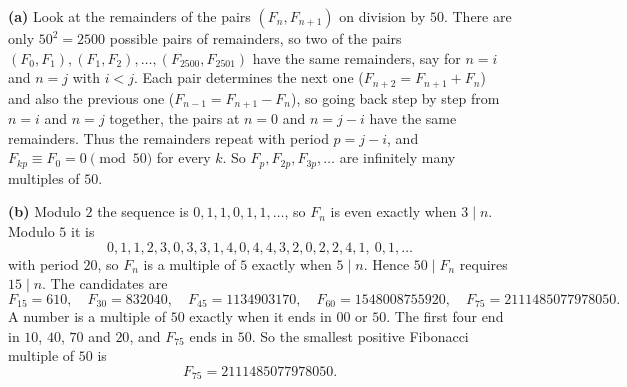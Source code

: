 \textbf{(a)} Look at the remainders of the pairs $(F_n,F_{n+1})$ on division by $50$. There are only $50^2=2500$ possible pairs of remainders, so two of the pairs $(F_0,F_1),(F_1,F_2),\dots,(F_{2500},F_{2501})$ have the same remainders, say for $n=i$ and $n=j$ with $i<j$. Each pair determines the next one ($F_{n+2}=F_{n+1}+F_n$) and also the previous one ($F_{n-1}=F_{n+1}-F_n$), so going back step by step from $n=i$ and $n=j$ together, the pairs at $n=0$ and $n=j-i$ have the same remainders. Thus the remainders repeat with period $p=j-i$, and $F_{kp}\equiv F_0=0\pmod{50}$ for every $k$. So $F_p,F_{2p},F_{3p},\dots$ are infinitely many multiples of $50$.

\textbf{(b)} Modulo $2$ the sequence is $0,1,1,0,1,1,\dots$, so $F_n$ is even exactly when $3\mid n$. Modulo $5$ it is
\[0,1,1,2,3,0,3,3,1,4,0,4,4,3,2,0,2,2,4,1,\ 0,1,\dots\]
with period $20$, so $F_n$ is a multiple of $5$ exactly when $5\mid n$. Hence $50\mid F_n$ requires $15\mid n$. The candidates are
\[F_{15}=610,\quad F_{30}=832040,\quad F_{45}=1134903170,\quad F_{60}=1548008755920,\quad F_{75}=2111485077978050.\]
A number is a multiple of $50$ exactly when it ends in $00$ or $50$. The first four end in $10$, $40$, $70$ and $20$, and $F_{75}$ ends in $50$. So the smallest positive Fibonacci multiple of $50$ is
\[F_{75}=\boxed{2111485077978050}.\]
